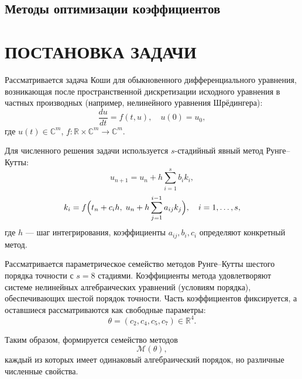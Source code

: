 \subsection{Методы оптимизации коэффициентов}


 \clearpage
\section{\centering ПОСТАНОВКА ЗАДАЧИ}

Рассматривается задача Коши для обыкновенного дифференциального уравнения, возникающая после пространственной дискретизации исходного уравнения в частных производных (например, нелинейного уравнения Шрёдингера):
\begin{equation}
	\frac{du}{dt} = f(t,u), \quad u(0) = u_0,
\end{equation}
где $u(t) \in \mathbb{C}^m$, $f: \mathbb{R} \times \mathbb{C}^m \to \mathbb{C}^m$.

Для численного решения задачи используется $s$-стадийный явный метод Рунге--Кутты:
\begin{equation}
	u_{n+1} = u_n + h \sum_{i=1}^{s} b_i k_i,
\end{equation}
\begin{equation}
	k_i = f\Bigl(t_n + c_i h,\; u_n + h \sum_{j=1}^{i-1} a_{ij} k_j \Bigr), \quad i = 1, \dots, s,
\end{equation}
где $h$ — шаг интегрирования, коэффициенты $a_{ij}, b_i, c_i$ определяют конкретный метод.

\medskip

Рассматривается параметрическое семейство методов Рунге--Кутты шестого порядка точности с $s = 8$ стадиями. Коэффициенты метода удовлетворяют системе нелинейных алгебраических уравнений (условиям порядка), обеспечивающих шестой порядок точности. Часть коэффициентов фиксируется, а оставшиеся рассматриваются как свободные параметры:
\begin{equation}
	\theta = (c_2, c_4, c_5, c_7) \in \mathbb{R}^4.
\end{equation}

Таким образом, формируется семейство методов
\begin{equation}
	\mathcal{M}(\theta),
\end{equation}
каждый из которых имеет одинаковый алгебраический порядок, но различные численные свойства.

\medskip

